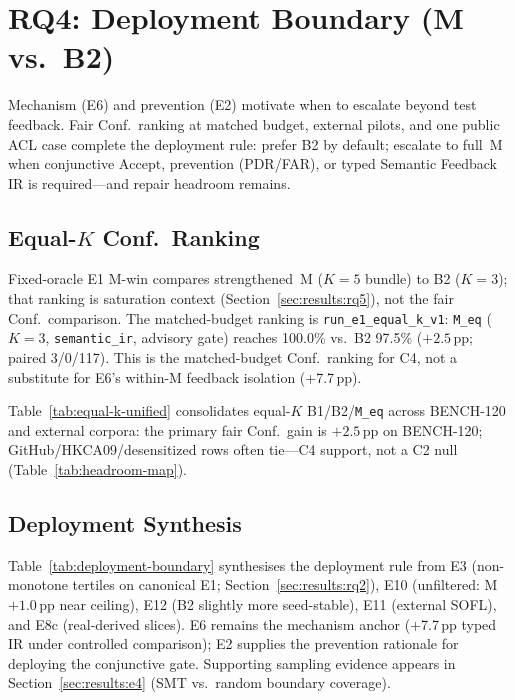 \section{RQ4: Deployment Boundary (M vs.\ B2)}
\label{sec:results:rq4}

Mechanism (E6) and prevention (E2) motivate when to escalate beyond test
feedback.
Fair Conf.\ ranking at matched budget, external pilots, and one public ACL
case complete the deployment rule: prefer B2 by default; escalate to full~M
when conjunctive $\mathrm{Accept}$, prevention (PDR/FAR), or typed Semantic
Feedback IR is required---and repair headroom remains.

\subsection{Equal-$K$ Conf.\ Ranking}

Fixed-oracle E1 M-win compares strengthened~M ($K{=}5$ bundle) to B2
($K{=}3$); that ranking is saturation context
(Section~\ref{sec:results:rq5}), not the fair Conf.\ comparison.
The matched-budget ranking is \texttt{run\_e1\_equal\_k\_v1}:
\texttt{M\_eq} ($K{=}3$, \texttt{semantic\_ir}, advisory gate) reaches
100.0\% vs.\ B2 97.5\% (${+}2.5$\,pp; paired 3/0/117).
This is the matched-budget Conf.\ ranking for C4, not a substitute for E6's
within-M feedback isolation (+7.7\,pp).



Table~\ref{tab:equal-k-unified} consolidates equal-$K$ B1/B2/\texttt{M\_eq}
across BENCH-120 and external corpora: the primary fair Conf.\ gain is
${+}2.5$\,pp on BENCH-120; GitHub/HKCA09/desensitized rows often tie---C4
support, not a C2 null (Table~\ref{tab:headroom-map}).

\subsection{Deployment Synthesis}

Table~\ref{tab:deployment-boundary} synthesises the deployment rule from
E3 (non-monotone tertiles on canonical E1; Section~\ref{sec:results:rq2}),
E10 (unfiltered: M ${+}1.0$\,pp near ceiling), E12 (B2 slightly more
seed-stable), E11 (external SOFL), and E8c (real-derived slices).
E6 remains the mechanism anchor (+7.7\,pp typed IR under controlled
comparison); E2 supplies the prevention rationale for deploying the
conjunctive gate.
Supporting sampling evidence appears in Section~\ref{sec:results:e4}
(SMT vs.\ random boundary coverage).

